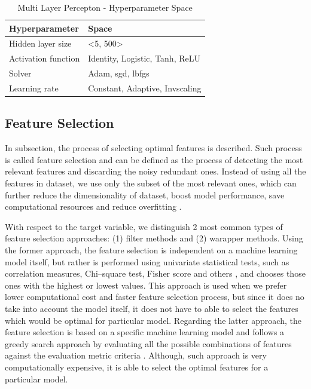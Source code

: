 \begin{table}[H]
\small
\setlength{\tabcolsep}{8pt}
\renewcommand{\arraystretch}{1.3}
\centering
    \caption[Multi Layer Percepton - Hyperparameter Space]{Multi Layer Percepton - Hyperparameter Space}\label{tab:mlpspace}
    \begin{tabular}{ll}
\toprule
\textbf{Hyperparameter} & \textbf{Space}\\
\midrule
\hline
Hidden layer size & <5, 500> \\
Activation function & Identity, Logistic, Tanh, ReLU \\
Solver & Adam, sgd, lbfgs \\
Learning rate & Constant, Adaptive, Invscaling \\
\hline
\bottomrule
\end{tabular}
\vspace{0.7em}

\vspace{-1em}
\end{table}

\subsection{Feature Selection}
\label{subsec:feature-selection}

In subsection, the process of selecting optimal features is described. Such process is called feature selection and can be defined as the process of detecting the most relevant features and discarding the noisy redundant ones. Instead of using all the features in dataset, we use only the subset of the most relevant ones, which can further reduce the dimensionality of dataset, boost model performance, save computational resources and reduce overfitting \citep{bolon2015feature}.

With respect to the target variable, we distinguish 2 most common types of feature selection approaches: (1) filter methods and (2) warapper methods.
Using the former approach, the feature selection is independent on a machine learning model itself, but rather is performed using univariate statistical tests, such as correlation measures, Chi--square test, Fisher score and others \citep{kaushik2016introduction}, and chooses those ones with the highest or lowest values.
This approach is used when we prefer lower computational cost and faster feature selection process, but since it does no take into account the model itself, it does not have to able to select the features which would be optimal for particular model.
Regarding the latter approach, the feature selection is based on a specific machine learning model and follows a greedy search approach by evaluating all the possible combinations of features against the evaluation metric criteria \citep{Verma2020}. Although, such approach is very computationally expensive, it is able to select the optimal features for a particular model.

